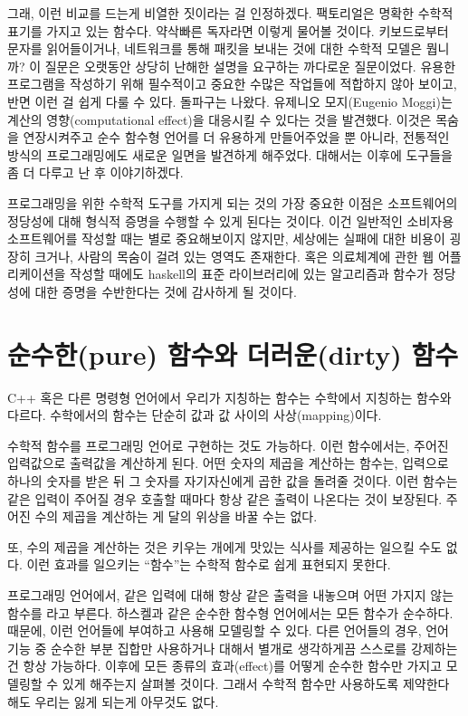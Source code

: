 그래, 이런 비교를 드는게 비열한 짓이라는 걸 인정하겠다. 팩토리얼은 명확한 수학적 표기를 가지고 있는 함수다. 약삭빠른 독자라면 이렇게 물어볼 것이다.
키보드로부터 문자를 읽어들이거나, 네트워크를 통해 패킷을 보내는 것에 대한 수학적 모델은 뭡니까? 이 질문은 오랫동안 상당히 난해한 설명을 요구하는 까다로운 질문이었다.
\trDenotationalSemantics\는 유용한 프로그램을 작성하기 위해 필수적이고 중요한 수많은 작업들에 적합하지 않아 보이고, 반면 \trOperationalSemantics\는 이런 걸 쉽게 다룰 수 있다.
돌파구는  나왔다. 유제니오 모지(Eugenio Moggi)는 계산의 영향(computational effect)을  대응시킬 수 있다는 것을 발견했다.
이것은  목숨을 연장시켜주고 순수 함수형 언어를 더 유용하게 만들어주었을 뿐 아니라, 전통적인 방식의 프로그래밍에도 새로운 일면을 발견하게 해주었다.
 대해서는 이후에  도구들을 좀 더 다루고 난 후 이야기하겠다.

프로그래밍을 위한 수학적 도구를 가지게 되는 것의 가장 중요한 이점은 소프트웨어의 정당성에 대해 형식적 증명을 수행할 수 있게 된다는 것이다.
이건 일반적인 소비자용 소프트웨어를 작성할 때는 별로 중요해보이지 않지만, 세상에는 실패에 대한 비용이 굉장히 크거나, 사람의 목숨이 걸려 있는 영역도 존재한다.
혹은 의료체계에 관한 웹 어플리케이션을 작성할 때에도 haskell의 표준 라이브러리에 있는 알고리즘과 함수가 정당성에 대한 증명을 수반한다는 것에 감사하게 될 것이다.

\section{순수한(pure) 함수와 더러운(dirty) 함수}

C++ 혹은 다른 명령형 언어에서 우리가 지칭하는 함수는 수학에서 지칭하는 함수와 다르다. 수학에서의 함수는 단순히 값과 값 사이의 사상(mapping)이다.

수학적 함수를 프로그래밍 언어로 구현하는 것도 가능하다. 이런 함수에서는, 주어진 입력값으로 출력값을 계산하게 된다.
어떤 숫자의 제곱을 계산하는 함수는, 입력으로 하나의 숫자를 받은 뒤 그 숫자를 자기자신에게 곱한 값을 돌려줄 것이다.
이런 함수는 같은 입력이 주어질 경우 호출할 때마다 항상 같은 출력이 나온다는 것이 보장된다.
주어진 수의 제곱을 계산하는 게 달의 위상을 바꿀 수는 없다.

또, 수의 제곱을 계산하는 것은 키우는 개에게 맛있는 식사를 제공하는 \trSideEffect\를 일으킬 수도 없다. 이런 효과를 일으키는 ``함수''는 수학적 함수로 쉽게 표현되지 못한다.

프로그래밍 언어에서, 같은 입력에 대해 항상 같은 출력을 내놓으며 어떤  가지지 않는 함수를 라고 부른다.
하스켈과 같은 순수한 함수형 언어에서는 모든 함수가 순수하다. 때문에, 이런 언어들에 \trDenotationalSemantics\를 부여하고 \trCategoryTheory\를 사용해 모델링할 수 있다.
다른 언어들의 경우, 언어 기능 중 순수한 부분 집합만 사용하거나  대해서 별개로 생각하게끔 스스로를 강제하는건 항상 가능하다.
이후에 \trMonad\가 모든 종류의 효과(effect)를 어떻게 순수한 함수만 가지고 모델링할 수 있게 해주는지 살펴볼 것이다.
그래서 수학적 함수만 사용하도록 제약한다 해도 우리는 잃게 되는게 아무것도 없다.

